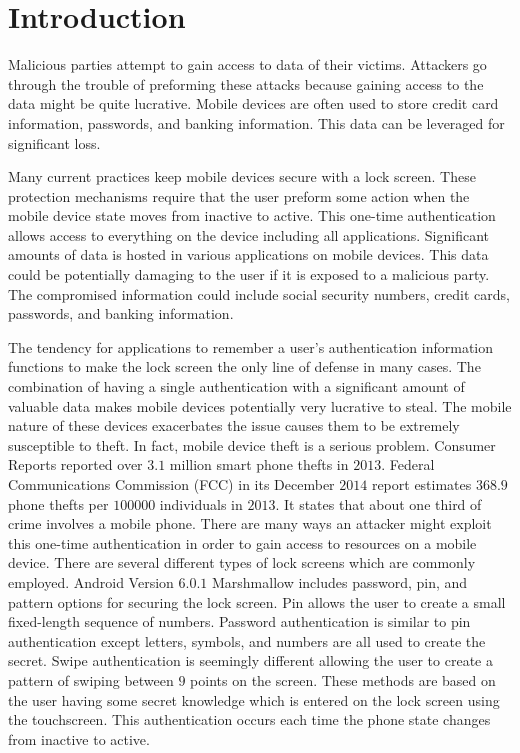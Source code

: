 \section{Introduction}
Malicious parties attempt to gain access to data of their victims. 
Attackers go through the trouble of
preforming these attacks because
gaining access to the data might be quite lucrative.
%
Mobile devices are often used to store
credit card information, passwords, and banking information.
This data can be leveraged for significant loss.

Many current practices keep mobile devices secure
with a lock screen.
These protection mechanisms require
that the user preform some action 
when the mobile device state moves from inactive to active.
This one-time authentication allows access 
to everything on the device
including all applications.
% 
Significant amounts of data is hosted 
in various applications on mobile devices.
This data could be potentially damaging to
the user if it is exposed to a malicious party.
The compromised information could include
social security numbers, credit cards, passwords, and banking information.

The tendency for applications to remember a user's
authentication information functions
to make the lock screen the only line of defense in many cases.
%
The combination of
having a single authentication with a significant amount
of valuable data makes mobile devices
potentially very lucrative to steal.
%
The mobile nature of these devices 
exacerbates the issue
causes them to be extremely susceptible to theft.
%
In fact, mobile device theft is a serious problem.
Consumer Reports \cite{CR14}
reported over $3.1$ million smart phone thefts in $2013$. 
Federal Communications Commission (FCC)\cite{FCC14}
in its December $2014$ report 
estimates $368.9$ phone thefts per $100000$ individuals in $2013$. 
It states that about one third of crime involves a mobile phone.
%
There are many ways an attacker might
exploit this one-time authentication 
in order to gain access to resources on a mobile device.
There are several different types of
lock screens which are commonly employed.
Android Version $6.0.1$ Marshmallow includes
password, pin, and pattern options for
securing the lock screen.
%
Pin allows the user to create a small fixed-length sequence of numbers.
Password authentication is similar to pin authentication
except letters, symbols, and numbers
are all used to create the secret.
Swipe authentication is seemingly different
allowing the user to create a pattern of swiping
between $9$ points on the screen.
These methods are based on the user having some secret knowledge
which is entered 
on the lock screen
using the touchscreen.
This authentication occurs each time the phone state
changes from inactive to active.

